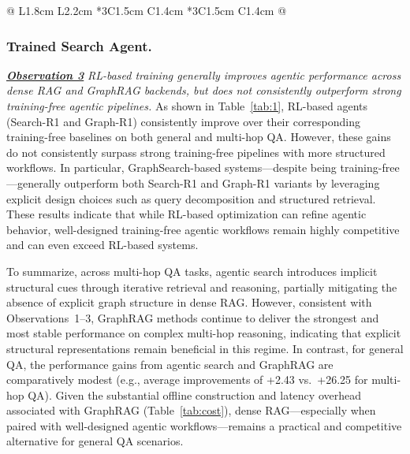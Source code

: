 \begin{table}[t]
\begin{tabular}{@{} L{1.8cm} L{2.2cm} *{3}{C{1.5cm}} C{1.4cm} *{3}{C{1.5cm}} C{1.4cm} @{}}
\specialrule{1.2pt}{0pt}{0pt}  %
\end{tabular}
\end{table}

\subsubsection{Trained Search Agent.}
\textbf{\textit{\underline{Observation 3}}} \textit{RL-based training generally improves agentic performance across dense RAG and GraphRAG backends, but does not consistently outperform strong training-free agentic pipelines.} As shown in Table~\ref{tab:1}, RL-based agents (Search-R1 and Graph-R1) consistently improve over their corresponding training-free baselines on both general and multi-hop QA. However, these gains do not consistently surpass strong training-free pipelines with more structured workflows. In particular, GraphSearch-based systems—despite being training-free—generally outperform both Search-R1 and Graph-R1 variants by leveraging explicit design choices such as query decomposition and structured retrieval. These results indicate that while RL-based optimization can refine agentic behavior, well-designed training-free agentic workflows remain highly competitive and can even exceed RL-based systems.



To summarize, across multi-hop QA tasks, agentic search introduces implicit structural cues through iterative retrieval and reasoning, partially mitigating the absence of explicit graph structure in dense RAG. However, consistent with Observations~1–3, GraphRAG methods continue to deliver the strongest and most stable performance on complex multi-hop reasoning, indicating that explicit structural representations remain beneficial in this regime.
In contrast, for general QA, the performance gains from agentic search and GraphRAG are comparatively modest (e.g., average improvements of +2.43 vs.\ +26.25 for multi-hop QA). Given the substantial offline construction and latency overhead associated with GraphRAG (Table~\ref{tab:cost}), dense RAG—especially when paired with well-designed agentic workflows—remains a practical and competitive alternative for general QA scenarios.

